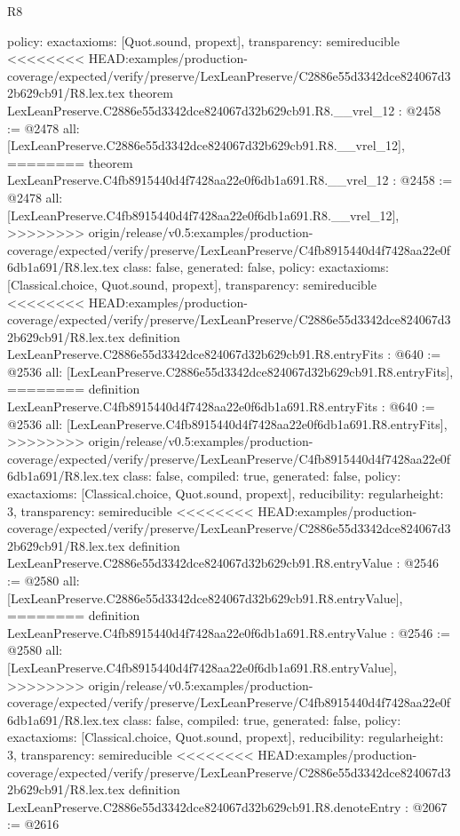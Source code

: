 \begin{lexlean}{R8}
\begin{coremodule}
{{{{{{{{{{{{{{{{{{{{{{{{{{{{{{{{{  policy: exact{axioms: [Quot.sound, propext]},
  transparency: semireducible
}
<<<<<<<< HEAD:examples/production-coverage/expected/verify/preserve/LexLeanPreserve/C2886e55d3342dce824067d32b629cb91/R8.lex.tex
theorem LexLeanPreserve.C2886e55d3342dce824067d32b629cb91.R8.__vrel_12 : @2458 := @2478 {
  all: [LexLeanPreserve.C2886e55d3342dce824067d32b629cb91.R8.__vrel_12],
========
theorem LexLeanPreserve.C4fb8915440d4f7428aa22e0f6db1a691.R8.__vrel_12 : @2458 := @2478 {
  all: [LexLeanPreserve.C4fb8915440d4f7428aa22e0f6db1a691.R8.__vrel_12],
>>>>>>>> origin/release/v0.5:examples/production-coverage/expected/verify/preserve/LexLeanPreserve/C4fb8915440d4f7428aa22e0f6db1a691/R8.lex.tex
  class: false,
  generated: false,
  policy: exact{axioms: [Classical.choice, Quot.sound, propext]},
  transparency: semireducible
}
<<<<<<<< HEAD:examples/production-coverage/expected/verify/preserve/LexLeanPreserve/C2886e55d3342dce824067d32b629cb91/R8.lex.tex
definition LexLeanPreserve.C2886e55d3342dce824067d32b629cb91.R8.entryFits : @640 := @2536 {
  all: [LexLeanPreserve.C2886e55d3342dce824067d32b629cb91.R8.entryFits],
========
definition LexLeanPreserve.C4fb8915440d4f7428aa22e0f6db1a691.R8.entryFits : @640 := @2536 {
  all: [LexLeanPreserve.C4fb8915440d4f7428aa22e0f6db1a691.R8.entryFits],
>>>>>>>> origin/release/v0.5:examples/production-coverage/expected/verify/preserve/LexLeanPreserve/C4fb8915440d4f7428aa22e0f6db1a691/R8.lex.tex
  class: false,
  compiled: true,
  generated: false,
  policy: exact{axioms: [Classical.choice, Quot.sound, propext]},
  reducibility: regular{height: 3},
  transparency: semireducible
}
<<<<<<<< HEAD:examples/production-coverage/expected/verify/preserve/LexLeanPreserve/C2886e55d3342dce824067d32b629cb91/R8.lex.tex
definition LexLeanPreserve.C2886e55d3342dce824067d32b629cb91.R8.entryValue : @2546 := @2580 {
  all: [LexLeanPreserve.C2886e55d3342dce824067d32b629cb91.R8.entryValue],
========
definition LexLeanPreserve.C4fb8915440d4f7428aa22e0f6db1a691.R8.entryValue : @2546 := @2580 {
  all: [LexLeanPreserve.C4fb8915440d4f7428aa22e0f6db1a691.R8.entryValue],
>>>>>>>> origin/release/v0.5:examples/production-coverage/expected/verify/preserve/LexLeanPreserve/C4fb8915440d4f7428aa22e0f6db1a691/R8.lex.tex
  class: false,
  compiled: true,
  generated: false,
  policy: exact{axioms: [Classical.choice, Quot.sound, propext]},
  reducibility: regular{height: 3},
  transparency: semireducible
}
<<<<<<<< HEAD:examples/production-coverage/expected/verify/preserve/LexLeanPreserve/C2886e55d3342dce824067d32b629cb91/R8.lex.tex
definition LexLeanPreserve.C2886e55d3342dce824067d32b629cb91.R8.denoteEntry : @2067 := @2616 {
}}}}}}}}}}}}}}}}}}}}}}}}}}}}}}}}}}}}
\end{coremodule}
\end{lexlean}
